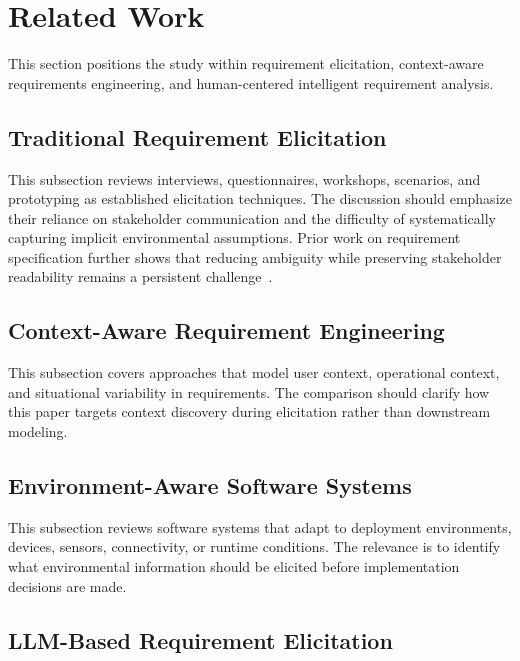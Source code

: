 \section{Related Work}
\label{related_work}

This section positions the study within requirement elicitation, context-aware requirements engineering, and human-centered intelligent requirement analysis.

\subsection{Traditional Requirement Elicitation}
\label{rw:traditional_elicitation}

This subsection reviews interviews, questionnaires, workshops, scenarios, and prototyping as established elicitation techniques.
The discussion should emphasize their reliance on stakeholder communication and the difficulty of systematically capturing implicit environmental assumptions.
Prior work on requirement specification further shows that reducing ambiguity while preserving stakeholder readability remains a persistent challenge~\cite{darifControlledNaturalLanguage2026}.

\subsection{Context-Aware Requirement Engineering}
\label{rw:context_aware_re}

This subsection covers approaches that model user context, operational context, and situational variability in requirements.
The comparison should clarify how this paper targets context discovery during elicitation rather than downstream modeling.

\subsection{Environment-Aware Software Systems}
\label{rw:environment_aware_systems}

This subsection reviews software systems that adapt to deployment environments, devices, sensors, connectivity, or runtime conditions.
The relevance is to identify what environmental information should be elicited before implementation decisions are made.

\subsection{LLM-Based Requirement Elicitation}
\label{rw:llm_elicitation}


